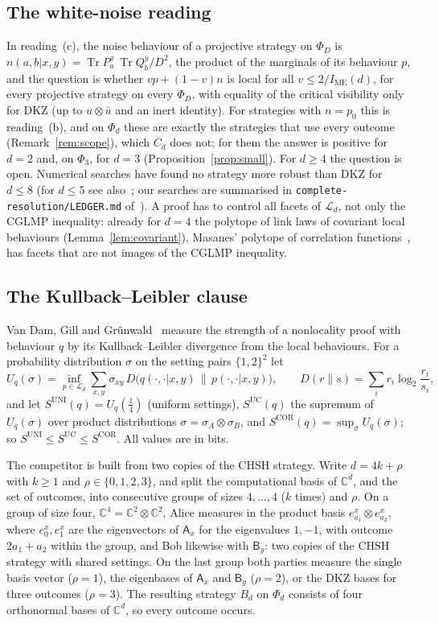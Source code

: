 \documentclass[11pt]{amsart}
\theoremstyle{definition}
\theoremstyle{remark}
\numberwithin{equation}{section}
\newcommand{\C}{\mathbb{C}}
\newcommand{\Tr}{\operatorname{Tr}}
\newcommand{\IME}{I_{\mathrm{ME}}}
\newcommand{\cL}{\mathcal{L}}
\begin{document}
\subsection{The white-noise reading}\label{subsec:white}
In reading~(c), the noise behaviour of a projective strategy on $\Phi_D$ is $n(a,b|x,y)=\Tr P^x_a\,\Tr Q^y_b/D^2$, the
product of the marginals of its behaviour $p$, and the question is whether $vp+(1-v)n$ is local for all
$v\le2/\IME(d)$, for every projective strategy on every $\Phi_D$, with equality of the critical visibility only for
DKZ (up to $u\otimes\bar u$ and an inert identity). For strategies with $n=p_0$ this is reading~(b), and on $\Phi_d$
these are exactly the strategies that use every outcome (Remark~\ref{rem:scope}), which $C_d$ does not; for them the
answer is positive for $d=2$ and, on $\Phi_3$, for $d=3$ (Proposition~\ref{prop:small}). For $d\ge4$ the question is
open. Numerical searches have found no strategy more robust than DKZ for $d\le8$ (for $d\le5$ see
also~\cite{GLZ}; our searches are summarised in \texttt{complete-resolution/LEDGER.md} of~\cite{repo-oqp27}). A proof
has to control all facets of $\cL_d$, not only the CGLMP inequality: already for $d=4$ the polytope of link laws of
covariant local behaviours (Lemma~\ref{lem:covariant}), Masanes' polytope of correlation functions~\cite{Masanes}, has
facets that are not images of the CGLMP inequality.

\subsection{The Kullback--Leibler clause}\label{subsec:kl}
Van Dam, Gill and Gr\"unwald~\cite{vDGG} measure the strength of a nonlocality proof with behaviour $q$ by its
Kullback--Leibler divergence from the local behaviours. For a probability distribution $\sigma$ on the setting pairs
$\{1,2\}^2$ let
\[
U_q(\sigma)=\inf_{p\in\cL_d}\sum_{x,y}\sigma_{xy}\,D\bigl(q(\cdot,\cdot|x,y)\,\big\|\,p(\cdot,\cdot|x,y)\bigr),\qquad
D(r\|s)=\sum_ir_i\log_2\frac{r_i}{s_i},
\]
and let $S^{\mathrm{UNI}}(q)=U_q(\frac14)$ (uniform settings), $S^{\mathrm{UC}}(q)$ the supremum of $U_q(\sigma)$ over
product distributions $\sigma=\sigma_A\otimes\sigma_B$, and $S^{\mathrm{COR}}(q)=\sup_\sigma U_q(\sigma)$; so
$S^{\mathrm{UNI}}\le S^{\mathrm{UC}}\le S^{\mathrm{COR}}$. All values are in bits.

The competitor is built from two copies of the CHSH strategy. Write $d=4k+\rho$ with $k\ge1$ and
$\rho\in\{0,1,2,3\}$, and split the computational basis of $\C^d$, and the set of outcomes, into consecutive groups of
sizes $4,\dots,4$ ($k$ times) and $\rho$. On a group of size four, $\C^4=\C^2\otimes\C^2$, Alice measures in the
product basis $e^x_{a_1}\otimes e^x_{a_2}$, where $e^x_0,e^x_1$ are the eigenvectors of $\mathsf A_x$ for the eigenvalues
$1,-1$, with outcome $2a_1+a_2$ within the group, and Bob likewise with $\mathsf B_y$: two copies of the CHSH strategy
with shared settings. On the last group both parties measure the single basis vector ($\rho=1$), the eigenbases of
$\mathsf A_x$ and $\mathsf B_y$ ($\rho=2$), or the DKZ bases for three outcomes ($\rho=3$). The resulting strategy $B_d$ on
$\Phi_d$ consists of four orthonormal bases of $\C^d$, so every outcome occurs.
\end{document}
